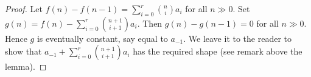 \documentclass[10pt,a4paper]{amsart}
\theoremstyle{plain}
\theoremstyle{definition}
\theoremstyle{remark}
\numberwithin{equation}{subsection}
\begin{document}
\begin{proof}
Let $f(n) - f(n-1) = \sum\nolimits_{i = 0}^r \binom{n}{i} a_i$
for all $n \gg 0$. Set
$g(n) = f(n) - \sum\nolimits_{i = 0}^r \binom{n + 1}{i + 1} a_i$.
Then $g(n) - g(n-1) = 0$ for all $n \gg 0$. Hence $g$ is
eventually constant, say equal to $a_{-1}$. We leave it
to the reader to show that
$a_{-1} + \sum\nolimits_{i = 0}^r \binom{n + 1}{i + 1} a_i$
has the required shape (see remark above the lemma).
\end{proof}
\end{document}
